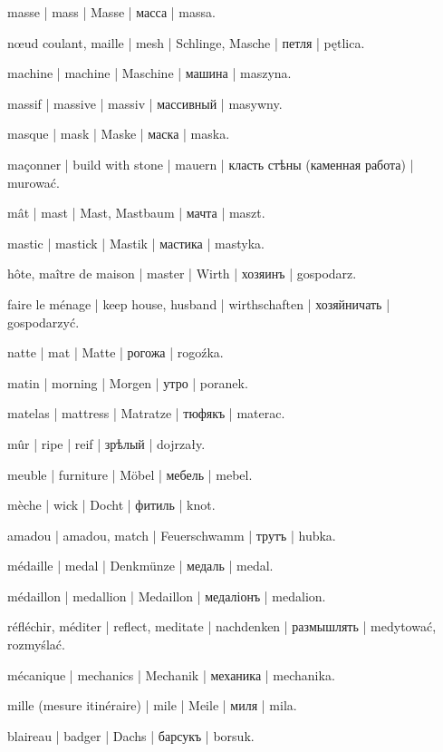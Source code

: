 \begin{outdent}{1em}
masse | mass | Masse | масса | massa.

nœud coulant, maille | mesh | Schlinge, Masche | петля | pętlica.

machine | machine | Maschine | машина | maszyna.

massif | massive | massiv | массивный | masywny.

masque | mask | Maske | маска | maska.

maçonner | build with stone | mauern | класть стѣны (каменная
работа) | murować.

mât | mast | Mast, Mastbaum | мачта | maszt.

mastic | mastick | Mastik | мастика | mastyka.

hôte, maître de maison | master | Wirth | хозяинъ | gospodarz.

\uvsubentry{}
faire le ménage | keep house, husband | wirthschaften | хозяйничать | gospodarzyć.

natte | mat | Matte | рогожа | rogoźka.

matin | morning | Morgen | утро | poranek.

matelas | mattress | Matratze | тюфякъ | materac.

mûr | ripe | reif | зрѣлый | dojrzały.

meuble | furniture | Möbel | мебель | mebel.

mèche | wick | Docht | фитиль | knot.

\uvsubentry{}
amadou | amadou, match | Feuerschwamm | трутъ | hubka.

médaille | medal | Denkmünze | медаль | medal.

médaillon | medallion | Medaillon | медаліонъ | medalion.

réfléchir, méditer | reflect, meditate | nachdenken | размышлять | medytować, rozmyślać.

mécanique | mechanics | Mechanik | механика | mechanika.

mille (mesure itinéraire) | mile | Meile | миля | mila.

blaireau | badger | Dachs | барсукъ | borsuk.


\end{outdent}

